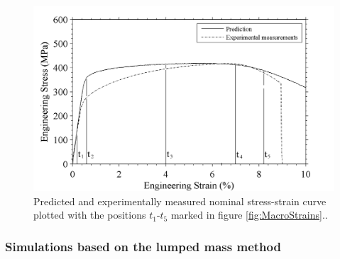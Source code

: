 \begin{figure}[h!t]
		\centering
		\includegraphics[width=.8\linewidth]{Figures/ModellingMethod/GlobalStressStrainaltered2}
		\caption[Global nominal stress-strain curve]{Predicted and experimentally measured nominal stress-strain curve plotted with the positions $t_1$-$t_5$ marked in figure \ref{fig:MacroStrains}..}
		\label{fig:GlobalStressStrain}
\end{figure}


\subsubsection{Simulations based on the lumped mass method}
\label{SMDModellingstudyResultsSims1to4Correction1}

